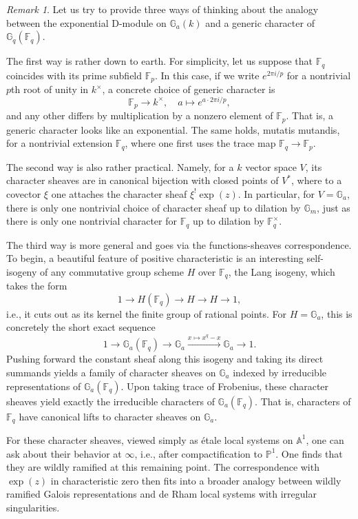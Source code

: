 \documentclass[10pt]{amsart}
\newcommand{\Fp}{\mathbb{F}_p}
\newcommand{\on}{\operatorname}
\newcommand{\Fq}{\mathbb{F}_q}
\theoremstyle{remark}
\newtheorem{re}[subsubsection]{Remark}
\numberwithin{equation}{section}
\begin{document}
\begin{re}Let us try to provide three ways of thinking about the analogy 
between 
the exponential D-module on $\mathbb{G}_a(k)$ and a generic character of 
$\mathbb{G}_q(\Fq)$. 

The first way is rather down to earth. For simplicity, let us suppose that 
$\mathbb{F}_q$ coincides with its prime subfield $\mathbb{F}_p$. In this case, 
if we write $e^{2\pi i / p}$ for a nontrivial $p$th root of unity in 
$k^\times$, a concrete choice of generic character is 
%
\[
   \mathbb{F}_p \rightarrow k^\times, \quad a \mapsto e^{ a\cdot 2\pi i / p }, 
\]
%
and any other differs by multiplication by a nonzero element of $\mathbb{F}_p$. 
That is, a generic character looks like an exponential. The same holds, {
mutatis mutandis}, for a nontrivial extension $\Fq$, where one first uses the trace 
map $\Fq \rightarrow \Fp$. 

The second way is also rather practical. Namely, for a $k$ vector space $V$, its 
character sheaves are in canonical bijection with closed points of $V^*$, where 
to a covector $\xi$ one attaches the character sheaf $\xi^! \on{exp}(z)$. In 
particular, for $V = \mathbb{G}_a$, there is only one nontrivial choice of 
character sheaf up to dilation by $\mathbb{G}_m$, just as there is only one nontrivial character 
for $\Fq$ up to dilation by $\Fq^\times$. 


The third way is more general and goes via the functions-sheaves correspondence. To 
begin, a beautiful feature of positive characteristic is an interesting 
self-isogeny of any commutative group scheme $H$ over $\Fq$, the Lang isogeny, 
which takes 
the form 
%
\[
   1 \rightarrow H(\Fq) \rightarrow H \rightarrow H \rightarrow 1,
\]
%
i.e., it cuts out as its kernel the finite group of rational points. For $H = 
\mathbb{G}_a$, this is concretely the short exact sequence 
%
\[
   1 \rightarrow \mathbb{G}_a(\Fq) \rightarrow \mathbb{G}_a \xrightarrow{x 
   \mapsto x^q - x} \mathbb{G}_a \rightarrow 1. 
\]
%
Pushing forward the constant sheaf along this isogeny and taking its direct 
summands yields a family of character sheaves on $\mathbb{G}_a$ indexed by 
irreducible representations of $\mathbb{G}_a(\Fq)$. Upon taking trace of 
Frobenius, these character sheaves yield exactly the irreducible characters of 
$\mathbb{G}_a(\Fq)$. That is, characters of $\Fq$ have canonical lifts to 
character sheaves on $\mathbb{G}_a$. 

For these character sheaves, viewed simply as \'etale local systems on 
$\mathbb{A}^1$, one can ask about their behavior at $\infty$, i.e., after compactification  
to $\mathbb{P}^1$. One finds that they are wildly ramified at this remaining 
point. The correspondence with $\on{exp}(z)$ in characteristic zero then fits into a broader analogy between wildly ramified Galois 
representations and de Rham local systems with irregular singularities. 
\end{re}	
\end{document}
